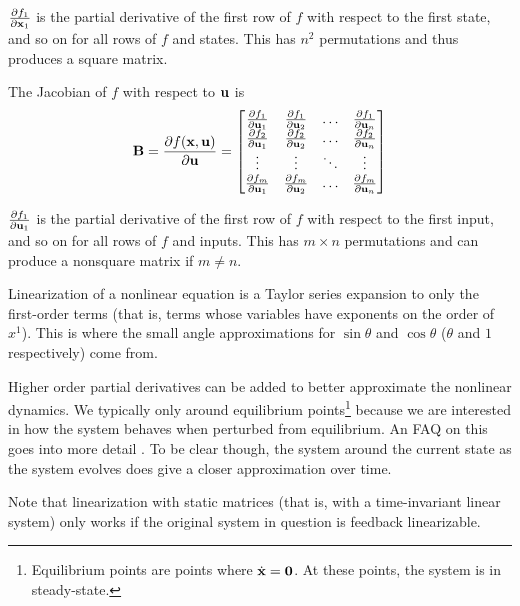 $\frac{\partial f_1}{\partial \mathbf{x}_1}$ is the partial derivative of the first
row of $f$ with respect to the first state, and so on for all rows of $f$ and
states. This has $n^2$ permutations and thus produces a square matrix.

The Jacobian of $f$ with respect to $\mathbf{u}$ is
\begin{equation*}
  \mathbf{B} = \frac{\partial f(\mathbf{x}, \mathbf{u})}{\partial \mathbf{u}} =
  \begin{bmatrix}
    \frac{\partial f_1}{\partial \mathbf{u}_1} &
      \frac{\partial f_1}{\partial \mathbf{u}_2} & \hdots &
      \frac{\partial f_1}{\partial \mathbf{u}_n} \\
    \frac{\partial f_2}{\partial \mathbf{u}_1} &
      \frac{\partial f_2}{\partial \mathbf{u}_2} & \hdots &
      \frac{\partial f_2}{\partial \mathbf{u}_n} \\
    \vdots & \vdots & \ddots & \vdots \\
    \frac{\partial f_m}{\partial \mathbf{u}_1} &
      \frac{\partial f_m}{\partial \mathbf{u}_2} & \hdots &
      \frac{\partial f_m}{\partial \mathbf{u}_n}
  \end{bmatrix}
\end{equation*}

$\frac{\partial f_1}{\partial \mathbf{u}_1}$ is the partial derivative of the first
row of $f$ with respect to the first input, and so on for all rows of $f$ and
inputs. This has $m \times n$ permutations and can produce a nonsquare matrix if
$m \neq n$.

Linearization of a nonlinear equation is a Taylor series expansion to only the
first-order terms (that is, terms whose variables have exponents on the order of
$x^1$). This is where the small angle approximations for $\sin\theta$ and
$\cos\theta$ ($\theta$ and $1$ respectively) come from.

Higher order partial derivatives can be added to better approximate the
nonlinear dynamics. We typically only  around
equilibrium points\footnote{Equilibrium points are points where
$\dot{\mathbf{x}} = \mathbf{0}$. At these points, the system is in steady-state.}
because we are interested in how the \gls{system} behaves when perturbed from
equilibrium. An FAQ on this goes into more detail
\cite{bib:linearize_equilibrium_point}. To be clear though,
 the \gls{system} around the current
\gls{state} as the \gls{system} evolves does give a closer approximation over
time.

Note that linearization with static matrices (that is, with a time-invariant
linear \gls{system}) only works if the original \gls{system} in question is
feedback linearizable.
